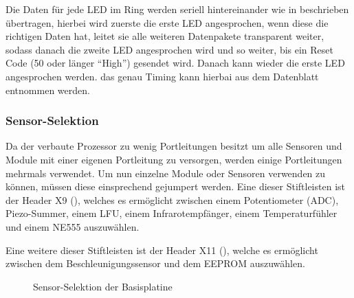 Die Daten für jede LED im Ring werden seriell hintereinander wie in  beschrieben übertragen, hierbei wird zuerste die erste LED angesprochen, wenn diese die richtigen Daten hat, leitet sie alle weiteren Datenpakete transparent weiter, sodass danach die zweite LED angesprochen wird und so weiter, bis ein Reset Code (\unit{50}{\micro\second} oder länger \enquote{High}) gesendet wird. Danach kann wieder die erste LED angesprochen werden. das genau Timing kann hierbai aus dem Datenblatt \cite{basis:ws2812b} entnommen werden.

\subsubsection{Sensor-Selektion}
Da der verbaute Prozessor zu wenig Portleitungen besitzt um alle Sensoren und Module mit einer eigenen Portleitung zu versorgen, werden einige Portleitungen mehrmals verwendet. Um nun einzelne Module oder Sensoren verwenden zu können, müssen diese einsprechend gejumpert werden. Eine dieser Stiftleisten ist der Header X9 (), welches es ermöglicht zwischen einem Potentiometer (\gls{ADC}), Piezo-Summer, einem LFU, einem Infrarotempfänger, einem Temperaturfühler und einem NE555 auszuwählen.

Eine weitere dieser Stiftleisten ist der Header X11 (), welche es ermöglicht zwischen dem Beschleunigungssensor und dem EEPROM auszuwählen.

\begin{figure}[H]
    \centering
    \qquad
    \qquad
    \caption[Sensor-Selektion der Basisplatine]{Sensor-Selektion der \gls{Basisplatine}}
    \label{fig:basisplatine-ssel}
\end{figure}

